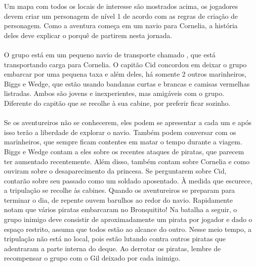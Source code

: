 Um mapa com todos os locais de interesse são mostrados acima, os jogadores devem criar um personagem de nível 1 de acordo com as regras de criação de personagem. 
Como a aventura começa em um navio para Cornelia, a história deles deve explicar o porquê de partirem nesta jornada.
%
\ofpar
%
\\\\
%
O grupo está em um pequeno navio de transporte chamado , que está transportando carga para Cornelia.
O capitão Cid concordou em deixar o grupo embarcar por uma pequena taxa e além deles, há somente 2 outros marinheiros, Biggs e Wedge, que estão usando bandanas curtas e brancas e camisas vermelhas listradas.
Ambos são jovens e inexperientes, mas amigáveis com o grupo. Diferente do capitão que se recolhe à sua cabine, por preferir ficar sozinho.
%
\ofpar
%
\\\\
%
Se os aventureiros não se conhecerem, eles podem se apresentar a cada um e após isso terão a liberdade de explorar o navio.
Também podem conversar com os marinheiros, que sempre ficam contentes em matar o tempo durante a viagem. 
Biggs e Wedge contam a eles sobre os recentes ataques de piratas, que parecem ter aumentado recentemente.
Além disso, também contam sobre Cornelia e como ouviram sobre o desaparecimento da princesa.
Se perguntarem sobre Cid, contarão sobre seu passado como um soldado aposentado.
À medida que escurece, a tripulação se recolhe às cabines.
Quando os aventureiros se preparam para terminar o dia, de repente ouvem barulhos ao redor do navio.
Rapidamente notam que vários piratas embarcaram no Bronquitito!
Na batalha a seguir, o grupo inimigo deve consistir de aproximadamente um pirata por jogador e dado o espaço restrito, assuma que todos estão ao alcance do outro.
Nesse meio tempo, a tripulação não está no local, pois estão lutando contra outros piratas que adentraram a parte interna do deque.
Ao derrotar os piratas, lembre de recompensar o grupo com o Gil deixado por cada inimigo.
%
\vfill
%
